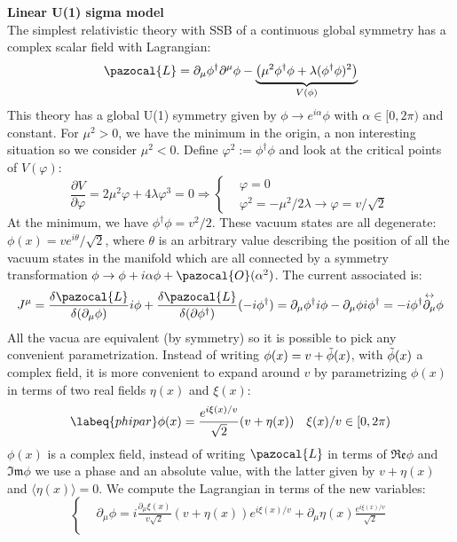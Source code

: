 \documentclass[../main.tex]{subfiles}
\begin{document}
\begin{example}
\textbf{Linear U(1) sigma model}\\
The simplest relativistic theory with SSB of a continuous global symmetry has a complex scalar field with Lagrangian:
\[
\pazocal{L}=\partial_\mu\phi^\dagger\partial^\mu\phi-\underbrace{\left(\mu^2\phi^\dagger\phi+\lambda(\phi^\dagger\phi)^2\right)}_{V(\phi)}
\]
This theory has a global U(1) symmetry given by $\phi\to e^{i\alpha}\phi$ with $\alpha\in[0,2\pi)$ and constant. For $\mu^2>0$, we have the minimum in the origin, a non interesting situation so we consider $\mu^2<0$. Define $\varphi^2:=\phi^\dagger\phi$ and look at the critical points of $V(\varphi)$:
\[
\frac{\partial V}{\partial\varphi}=2\mu^2\varphi+4\lambda\varphi^3=0\Rightarrow
\left\{
\begin{aligned}
&\varphi=0\\
&\varphi^2=-\mu^2/2\lambda\to\varphi=v/\sqrt{2}
\end{aligned}
\right.
\]
At the minimum, we have $\phi^\dagger\phi=v^2/2$. These vacuum states are all degenerate: $\phi(x)=ve^{i\theta}/\sqrt{2}$, where $\theta$ is an arbitrary value describing the position of all the vacuum states in the manifold which are all connected by a symmetry transformation $\phi\to\phi+i\alpha\phi+\pazocal{O}(\alpha^2)$. The current associated is:
\[
J^\mu=\frac{\delta\pazocal{L}}{\delta(\partial_\mu\phi)}i\phi+\frac{\delta\pazocal{L}}{\delta(\partial\phi^\dagger)}(-i\phi^\dagger)=\partial_\mu\phi^\dagger i\phi-\partial_\mu\phi i\phi^\dagger=-i\phi^\dagger\overset{\leftrightarrow}{\partial_\mu}\phi
\]
All the vacua are equivalent (by symmetry) so it is possible to pick any convenient parametrization. Instead of writing $\phi(x)=v+\Tilde{\phi}(x)$, with $\Tilde{\phi}(x)$ a complex field, it is more convenient to expand around $v$ by parametrizing $\phi(x)$ in terms of two real fields $\eta(x)$ and $\xi(x)$:
\begin{equation}
\labeq{phipar}
\phi(x)=\frac{e^{i\xi(x)/v}}{\sqrt{2}}(v+\eta(x)) \quad \xi(x)/v\in[0,2\pi)
\end{equation}
$\phi(x)$ is a complex field, instead of writing $\pazocal{L}$ in terms of $\mathfrak{Re}\phi$ and $\mathfrak{Im}\phi$ we use a phase and an absolute value, with the latter given by $v+\eta(x)$ and $\langle\eta(x)\rangle=0$. We compute the Lagrangian in terms of the new variables:
\[
\left\{
\begin{aligned}
&\partial_\mu\phi=i\frac{\partial_\mu\xi(x)}{v\sqrt{2}}(v+\eta(x))e^{i\xi(x)/v}+\partial_\mu\eta(x)\frac{e^{i\xi(x)/v}}{\sqrt{2}}\\

\end{aligned}\]
\end{example}
\end{document}
